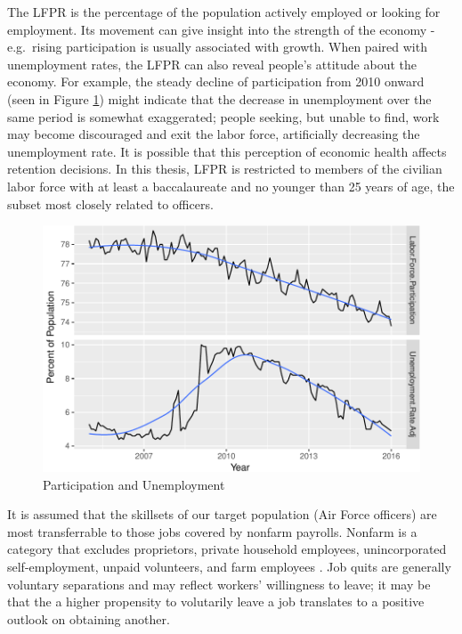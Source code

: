 \documentclass[12pt,letterpaper,toc=flat,oneside]{report}
\theoremstyle{definition}
\theoremstyle{definition}
\theoremstyle{definition}
\theoremstyle{remark}
\begin{document}
The LFPR is the percentage of the population actively employed or
looking for employment. Its movement can give insight into the strength
of the economy - e.g.~rising participation is usually associated with
growth. When paired with unemployment rates, the LFPR can also reveal
people's attitude about the economy. For example, the steady decline of
participation from 2010 onward (seen in Figure
\ref{fig:lfpr-unemployment}) might indicate that the decrease in
unemployment over the same period is somewhat exaggerated; people
seeking, but unable to find, work may become discouraged and exit the
labor force, artificially decreasing the unemployment rate. It is
possible that this perception of economic health affects retention
decisions. In this thesis, LFPR is restricted to members of the civilian
labor force with at least a baccalaureate and no younger than 25 years
of age, the subset most closely related to officers.

\begin{figure}[H]

{\centering \includegraphics{elliott-econometric-personnel-retention-18_files/figure-latex/lfpr-unemployment-1} 

}

\caption{Participation and Unemployment}\label{fig:lfpr-unemployment}
\end{figure}

It is assumed that the skillsets of our target population (Air Force
officers) are most transferrable to those jobs covered by nonfarm
payrolls. Nonfarm is a category that excludes proprietors, private
household employees, unincorporated self-employment, unpaid volunteers,
and farm employees \cite{fred-nonfarm-2017}. Job quits are generally
voluntary separations and may reflect workers' willingness to leave; it
may be that the a higher propensity to volutarily leave a job translates
to a positive outlook on obtaining another.
\end{document}

